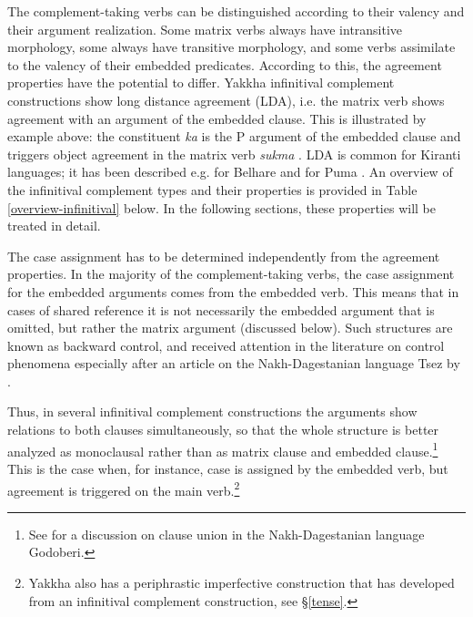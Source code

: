  The complement-taking verbs can be distinguished according to their valency and their argument realization. Some matrix verbs always have intransitive morphology, some always have transitive morphology, and some verbs assimilate to the valency of their embedded predicates.   According  to this, the agreement properties have the potential to differ. Yakkha infinitival complement constructions show long distance agreement (LDA), i.e. the matrix verb shows agreement with an argument of the embedded clause. This is illustrated  by example \LLast[b] above: the constituent \emph{ka}  is the P argument of the embedded clause and triggers object agreement in the matrix verb \emph{sukma} . LDA is common for Kiranti languages; it has been described  e.g. for Belhare \citep{Bickeletal2001Syntactic, Bickel2004Hidden} and for Puma \citep{Schackow2008Clause}. An overview of the infinitival complement types and their properties is provided in Table \ref{overview-infinitival} below. In the following sections, these properties will be treated in detail.
 
The case assignment has to be determined independently from the agreement properties. In the majority of the complement-taking verbs, the case assignment for the embedded arguments comes from the embedded verb. This means that in cases of shared reference it is not necessarily the embedded argument that is omitted, but rather the matrix argument (discussed below). Such structures are known as backward control, and received attention in the literature on control phenomena especially after an article on the Nakh-Dagestanian language Tsez by \citet{Polinskyetal2002_Backward}. 

Thus, in several infinitival complement constructions the arguments show relations to both clauses simultaneously, so that the whole structure is better analyzed as monoclausal rather than as matrix clause and embedded clause.\footnote{See \citet{Haspelmath1999Long-distance} for a discussion on clause union in the Nakh-Dagestanian language Godoberi.}  This is the case when, for instance,  case is assigned by the embedded verb, but agreement is triggered on the  main verb.\footnote{Yakkha also has a periphrastic imperfective construction that  has developed from an infinitival complement construction, see §\ref{tense}.}  



